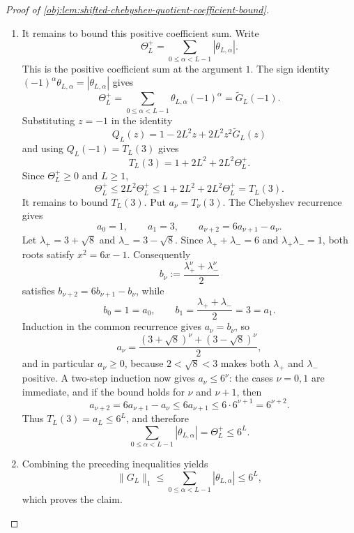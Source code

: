 \begin{proof}[Proof of \cref{obj:lem:shifted-chebyshev-quotient-coefficient-bound}]
\begin{enumerate}
\item It remains to bound this positive coefficient sum. Write
\[
\Theta_L^+
=
\sum_{0\le \alpha<L-1}|\theta_{L,\alpha}|.
\]
This is the positive coefficient sum at the argument \(1\). The sign identity
\((-1)^\alpha\theta_{L,\alpha}=|\theta_{L,\alpha}|\) gives
\[
\Theta_L^+
=
\sum_{0\le \alpha<L-1}\theta_{L,\alpha}(-1)^\alpha
=
\widetilde G_L(-1).
\]
Substituting \(z=-1\) in the identity
\[
Q_L(z)=1-2L^2z+2L^2z^2\widetilde G_L(z)
\]
and using \(Q_L(-1)=T_L(3)\) gives
\[
T_L(3)=1+2L^2+2L^2\Theta_L^+ .
\]
Since \(\Theta_L^+\ge0\) and \(L\ge1\),
\[
\Theta_L^+
\le
2L^2\Theta_L^+
\le
1+2L^2+2L^2\Theta_L^+
=
T_L(3).
\]
It remains to bound \(T_L(3)\). Put \(a_\nu=T_\nu(3)\). The Chebyshev recurrence gives
\[
a_0=1,\qquad a_1=3,\qquad
a_{\nu+2}=6a_{\nu+1}-a_\nu .
\]
Let \(\lambda_+=3+\sqrt8\) and \(\lambda_-=3-\sqrt8\).  Since
\(\lambda_++\lambda_-=6\) and \(\lambda_+\lambda_-=1\), both roots satisfy
\(x^2=6x-1\).  Consequently
\[
b_\nu:=\frac{\lambda_+^\nu+\lambda_-^\nu}{2}
\]
satisfies \(b_{\nu+2}=6b_{\nu+1}-b_\nu\), while
\[
b_0=1=a_0,\qquad b_1=\frac{\lambda_++\lambda_-}{2}=3=a_1.
\]
Induction in the common recurrence gives \(a_\nu=b_\nu\), so
\[
a_\nu
=
\frac{(3+\sqrt8)^\nu+(3-\sqrt8)^\nu}{2},
\]
and in particular \(a_\nu\ge0\), because \(2<\sqrt8<3\) makes both
\(\lambda_+\) and \(\lambda_-\) positive. A two-step induction now gives \(a_\nu\le6^\nu\): the cases \(\nu=0,1\) are immediate, and if the bound holds for \(\nu\) and \(\nu+1\), then
\[
a_{\nu+2}=6a_{\nu+1}-a_\nu
\le 6a_{\nu+1}
\le 6\cdot 6^{\nu+1}
=6^{\nu+2}.
\]
Thus \(T_L(3)=a_L\le6^L\), and therefore
\[
\sum_{0\le \alpha<L-1}|\theta_{L,\alpha}|
=
\Theta_L^+
\le 6^L .
\]

\item Combining the preceding inequalities yields
\[
\|G_L\|_1
\le
\sum_{0\le \alpha<L-1}|\theta_{L,\alpha}|
\le
6^L,
\]
which proves the claim. %
\end{enumerate}
\end{proof}
